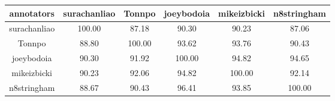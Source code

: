 \begin{tabular}{ |c|c|c|c|c|c|}\hline
annotators& surachanliao& Tonnpo& joeybodoia& mikeizbicki& n8stringham\\\hline
surachanliao& 100.00& 87.18& 90.30& 90.23& 87.06\\\hline
Tonnpo& 88.80& 100.00& 93.62& 93.76& 90.43\\\hline
joeybodoia& 90.30& 91.92& 100.00& 94.82& 94.65\\\hline
mikeizbicki& 90.23& 92.06& 94.82& 100.00& 92.14\\\hline
n8stringham& 88.67& 90.43& 96.41& 93.85& 100.00\\\hline
\end{tabular}